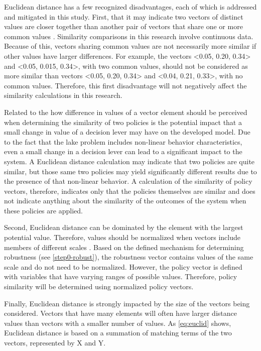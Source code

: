 \begin{enumerate}[leftmargin=*,align=left,label=\textbf{Comparison \arabic* :}]
Euclidean distance has a few recognized disadvantages, each of which is addressed and mitigated in this study. First, that it may indicate two vectors of distinct values are closer together than another pair of vectors that share one or more common values \citep{Shirkhorshidi2015}. Similarity comparisons in this research involve continuous data. Because of this, vectors sharing common values are not necessarily more similar if other values have larger differences. For example, the vectors <0.05, 0.20, 0.34> and <0.05, 0.015, 0.34>, with two common values, should not be considered as more similar than vectors <0.05, 0.20, 0.34> and <0.04, 0.21, 0.33>, with no common values. Therefore, this first disadvantage will not negatively affect the similarity calculations in this research. 

Related to the how difference in values of a vector element should be perceived when determining the similarity of two policies is the potential impact that a small change in value of a decision lever may have on the developed model. Due to the fact that the lake problem includes non-linear behavior characteristics, even a small change in a decision lever can lead to a significant impact to the system. A Euclidean distance calculation may indicate that two policies are quite similar, but those same two policies may yield significantly different results due to the presence of that non-linear behavior. A calculation of the similarity of policy vectors, therefore, indicates only that the policies themselves are similar and does not indicate anything about the similarity of the outcomes of the system when these policies are applied. 

Second, Euclidean distance can be dominated by the element with the largest potential value. Therefore, values should be normalized when vectors include members of different scales \citep{Shirkhorshidi2015}. Based on the defined mechanism for determining robustness (see \cref{step0-robust}), the robustness vector contains values of the same scale and do not need to be normalized. However, the policy vector is defined with variables that have varying ranges of possible values. Therefore, policy similarity will be determined using normalized policy vectors. 

Finally, Euclidean distance is strongly impacted by the size of the vectors being considered. Vectors that have many elements will often have larger distance values than vectors with a smaller number of values. As \cref{eq:euclid} shows, Euclidean distance is based on a summation of matching terms of the two vectors, represented by X and Y. 


\end{enumerate}

